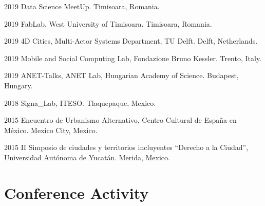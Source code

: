 \documentclass{academiccv}
\begin{document}
\begin{tablist}

\item[2019] \tab Data Science MeetUp. Timisoara, Romania.

\item[2019] \tab FabLab, West University of Timisoara. Timisoara, Romania.

\item[2019] \tab 4D Cities, Multi-Actor Systems Department, TU Delft. Delft, Netherlands.

\item[2019] \tab Mobile and Social Computing Lab, Fondazione Bruno Kessler. Trento, Italy.

\item[2019] \tab ANET-Talks, ANET Lab, Hungarian Academy of Science. Budapest, Hungary.

\item[2018] \tab Signa\_Lab, ITESO. Tlaquepaque, Mexico.

\item[2015] \tab Encuentro de Urbanismo Alternativo, Centro Cultural de España en México. Mexico City, Mexico.

\item[2015] \tab II Simposio de ciudades y territorios incluyentes \enquote{Derecho a la Ciudad}, Universidad Autónoma de Yucatán. Merida, Mexico.
\end{tablist}


\section*{Conference Activity}





\end{document}
